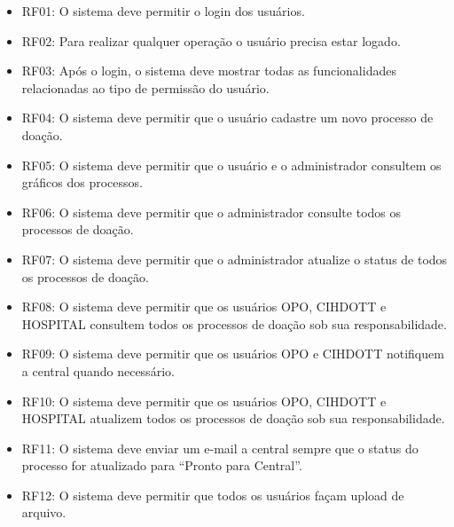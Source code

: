 \documentclass[portuguese,oneside]{tcc}
\begin{document}
\begin{itemize}


\item RF01: O sistema deve permitir o login dos usuários.

\item RF02: Para realizar qualquer operação o usuário precisa estar logado.

\item RF03: Após o login, o sistema deve mostrar todas as funcionalidades relacionadas ao tipo de permissão do usuário.

\item RF04: O sistema deve permitir que o usuário cadastre um novo processo de doação.

\item RF05: O sistema deve permitir que o usuário e o administrador consultem os gráficos dos processos.


\item RF06: O sistema deve permitir que o administrador consulte todos os processos de doação.

\item RF07: O sistema deve permitir que o administrador atualize o status de todos os processos de doação.


\item RF08: O sistema deve permitir que os usuários OPO, CIHDOTT e HOSPITAL consultem todos os processos de doação sob sua responsabilidade.

\item RF09: O sistema deve permitir que os usuários OPO e CIHDOTT notifiquem a central quando necessário.

\item RF10: O sistema deve permitir que os usuários OPO, CIHDOTT e HOSPITAL atualizem todos os processos de doação sob sua responsabilidade.

\item RF11: O sistema deve enviar um e-mail a central sempre que o status do processo for atualizado para “Pronto para Central”.

\item RF12: O sistema deve permitir que todos os usuários façam upload de arquivo.


\end{itemize}
\end{document}

